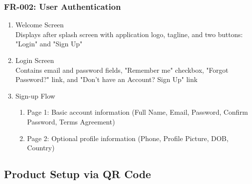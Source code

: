 \documentclass[conference]{IEEEtran}
\begin{document}
        \subsubsection{FR-002: User Authentication}
            \begin{enumerate}
                \item Welcome Screen\\
                    Displays after splash screen with application logo, tagline, and two buttons: "Login" and "Sign Up"
                \item Login Screen\\
                    Contains email and password fields, "Remember me" checkbox, "Forgot Password?" link, and "Don't have an Account? Sign Up" link
                \item Sign-up Flow
                    \begin{enumerate}
                        \item Page 1: Basic account information (Full Name, Email, Password, Confirm Password, Terms Agreement)
                        \item Page 2: Optional profile information (Phone, Profile Picture, DOB, Country)
                    \end{enumerate}
            \end{enumerate}
    \subsection{\textbf{Product Setup via QR Code}}
\end{document}
